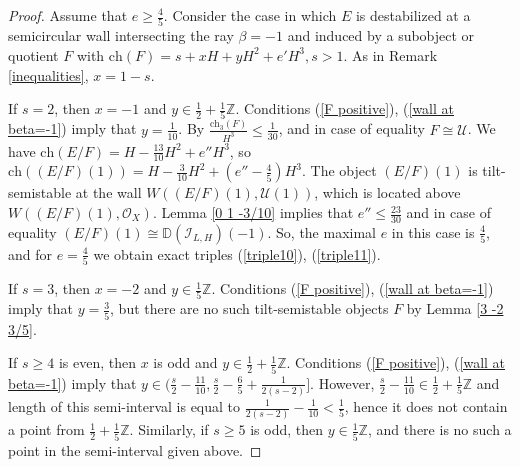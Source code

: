 \documentclass{amsart}
\begin{document}
	\begin{proof}Assume that $e\ge\frac 45$. Consider the case in which $E$ is destabilized at a semicircular wall intersecting the ray $\beta=-1$ and induced by a subobject or quotient $F$ with $\mathrm{ch}(F)=s+xH+yH^2+e'H^3,s>1$. As in Remark \ref{inequalities}, $x=1-s$.
		
		If $s=2$, then $x=-1$ and $y\in\frac 12+\frac 15\mathbb Z$. Conditions (\ref{F positive}), (\ref{wall at beta=-1}) imply that $y=\frac{1}{10}$. By \cite[Lemma 3.6]{Vass} $\frac{\mathrm{ch}_3(F)}{H^3}\le\frac{1}{30}$, and in case of equality $F\cong\mathcal U$. We have $\mathrm{ch}(E/F)=H-\frac{13}{10}H^2+e''H^3$, so $\mathrm{ch}((E/F)(1))=H-\frac{3}{10}H^2+(e''-\frac 45)H^3$. The object $(E/F)(1)$ is tilt-semistable at the wall $W((E/F)(1),\mathcal U(1))$, which is located above $W((E/F)(1),\mathcal O_X)$. Lemma \ref{0 1 -3/10} implies that $e''\le\frac{23}{30}$ and in case of equality $(E/F)(1)\cong \mathbb D(\mathcal I_{L,H})(-1)$. So, the maximal $e$ in this case is $\frac 45$, and for $e=\frac 45$ we obtain exact triples (\ref{triple10}), (\ref{triple11}).
		
		If $s=3$, then $x=-2$ and $y\in\frac 15\mathbb Z$. Conditions (\ref{F positive}), (\ref{wall at beta=-1}) imply that $y=\frac 35$, but there are no such tilt-semistable objects $F$ by Lemma \ref{3 -2 3/5}.
		
		If $s\ge 4$ is even, then $x$ is odd and $y\in\frac 12+\frac 15\mathbb Z$. Conditions (\ref{F positive}), (\ref{wall at beta=-1}) imply that $y\in(\frac s2-\frac{11}{10},\frac s2-\frac 65+\frac{1}{2(s-2)}]$. However, $\frac s2-\frac{11}{10}\in\frac 12+\frac 15\mathbb Z$ and length of this semi-interval is equal to $\frac{1}{2(s-2)}-\frac{1}{10}<\frac 15$, hence it does not contain a point from $\frac 12+\frac 15\mathbb Z$. Similarly, if $s\ge 5$ is odd, then $y\in\frac 15\mathbb Z$, and there is no such a point in the semi-interval given above.
		

\end{proof}
\end{document}
